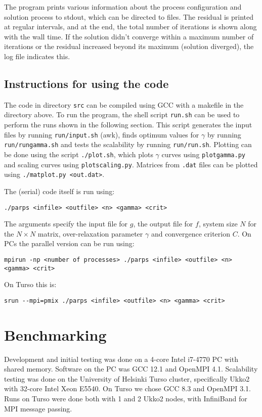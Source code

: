 \documentclass[10pt]{article}
\begin{document}
The program prints various information about the process configuration and solution process to stdout, which can be directed to files. The residual is printed at regular intervals, and at the end, the total number of iterations is shown along with the wall time. If the solution didn't converge within a maximum number of iterations or the residual increased beyond its maximum (solution diverged), the log file indicates this.

\subsection{Instructions for using the code}

The code in directory \verb|src| can be compiled using GCC with a makefile in the directory above. To run the program, the shell script \verb|run.sh| can be used to perform the runs shown in the following section. This script generates the input files by running \verb|run/input.sh| (awk), finds optimum values for $\gamma$ by running \verb|run/rungamma.sh| and tests the scalability by running \verb|run/run.sh|. Plotting can be done using the script \verb|./plot.sh|, which plots $\gamma$ curves using \verb|plotgamma.py| and scaling curves using \verb|plotscaling.py|. Matrices from \verb|.dat| files can be plotted using \verb|./matplot.py <out.dat>|.

The (serial) code itself is run using:
\begin{lstlisting}[numbers=none]
  ./parps <infile> <outfile> <n> <gamma> <crit>
\end{lstlisting}
The arguments specify the input file for $g$, the output file for $f$, system size $N$ for the $N \times N$ matrix, over-relaxation parameter $\gamma$ and convergence criterion $C$. On PCs the parallel version can be run using:
\begin{lstlisting}[numbers=none]
  mpirun -np <number of processes> ./parps <infile> <outfile> <n> <gamma> <crit>
\end{lstlisting}
On Turso this is:
\begin{lstlisting}[numbers=none]
  srun --mpi=pmix ./parps <infile> <outfile> <n> <gamma> <crit>
\end{lstlisting}

\section{Benchmarking}

Development and initial testing was done on a 4-core Intel i7-4770 PC with shared memory. Software on the PC was GCC 12.1 and OpenMPI 4.1. Scalability testing was done on the University of Helsinki Turso cluster, specifically Ukko2 with 32-core Intel Xeon E5540. On Turso we chose GCC 8.3 and OpenMPI 3.1. Runs on Turso were done both with 1 and 2 Ukko2 nodes, with InfiniBand for MPI message passing.
\end{document}
